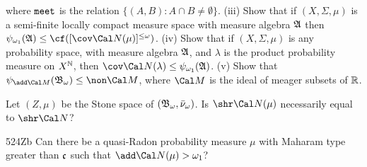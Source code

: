 {

\noindent where
$\text{\tt{meet}}$ is the relation $\{(A,B):A\cap B\ne\emptyset\}$.
(iii) Show that if $(X,\Sigma,\mu)$ is a semi-finite locally compact
measure space with measure algebra $\frak A$ then
$\psi_{\omega_1}(\frak A)\le\cf([\cov\Cal N(\mu)]^{\le\omega})$.
(iv) Show that if $(X,\Sigma,\mu)$ is any probability space, with measure
algebra $\frak A$, and $\lambda$ is the product probability measure
on $X^{\Bbb N}$, then
$\cov\Cal N(\lambda)\le\psi_{\omega_1}(\frak A)$.
(v) Show that $\psi_{\add\Cal M}(\frak B_{\omega})\le\non\Cal M$, where
$\Cal M$ is the ideal of meager subsets of $\Bbb R$.
}%

Let $(Z,\mu)$ be the Stone space of
$(\frak B_{\omega},\bar\nu_{\omega})$.   Is $\shr\Cal N(\mu)$
necessarily equal to $\shr\Cal N$?

\spheader 524Zb Can there be a quasi-Radon probability measure $\mu$ with
Maharam type greater than $\frak c$ such that $\add\Cal N(\mu)>\omega_1$?


